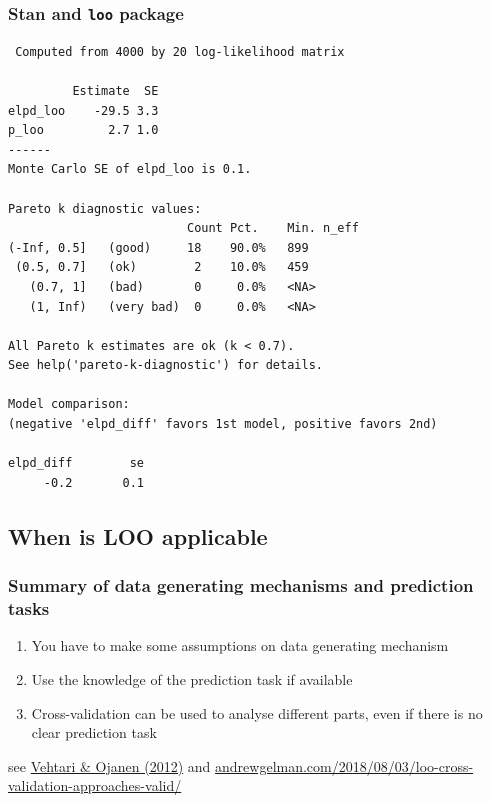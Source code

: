 \documentclass[10pt]{beamer}
\begin{document}
\begin{frame}[fragile]

\frametitle{Stan and {\tt loo} package}

  {\scriptsize
\begin{lstlisting}
 Computed from 4000 by 20 log-likelihood matrix

         Estimate  SE
elpd_loo    -29.5 3.3
p_loo         2.7 1.0
------
Monte Carlo SE of elpd_loo is 0.1.

Pareto k diagnostic values:
                         Count Pct.    Min. n_eff
(-Inf, 0.5]   (good)     18    90.0%   899
 (0.5, 0.7]   (ok)        2    10.0%   459
   (0.7, 1]   (bad)       0     0.0%   <NA>
   (1, Inf)   (very bad)  0     0.0%   <NA>

All Pareto k estimates are ok (k < 0.7).
See help('pareto-k-diagnostic') for details.

Model comparison:
(negative 'elpd_diff' favors 1st model, positive favors 2nd)

elpd_diff        se
     -0.2       0.1
\end{lstlisting}
}

\end{frame}

\subsection{When is LOO applicable}

\begin{frame}{}

\frametitle{ Summary of data generating mechanisms and prediction tasks}

\begin{enumerate}
\item You have to make some assumptions on data generating mechanism
\item Use the knowledge of the prediction task if available
\item Cross-validation can be used to analyse different parts, even if
  there is no clear prediction task
\end{enumerate}

 \vspace{6.5\baselineskip}
{ \small see \href{http://dx.doi.org/10.1214/12-SS102}{Vehtari \& Ojanen (2012)} and \url{andrewgelman.com/2018/08/03/loo-cross-validation-approaches-valid/}}

\end{frame}
\end{document}
